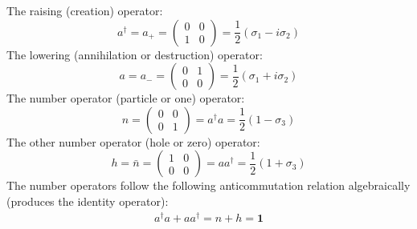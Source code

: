 The raising (creation) operator: 
\begin{equation}
    a^{\dagger} = a_{+} = \begin{pmatrix} 0 & 0 \\ 1 & 0 \end{pmatrix} = \frac{1}{2}(\sigma_{1} - i\sigma_{2})
\end{equation}
The lowering (annihilation or destruction) operator:
\begin{equation}
    a = a_{-} = \begin{pmatrix} 0 & 1 \\ 0 & 0 \end{pmatrix}  = \frac{1}{2}(\sigma_{1} + i\sigma_{2})
\end{equation}
The number operator (particle or one) operator:
\begin{equation}
    n = \begin{pmatrix}  0 & 0 \\ 0 & 1 \end{pmatrix} = a^{\dagger}a = \frac{1}{2}(1 - \sigma_{3})
\end{equation}
The other number operator (hole or zero) operator:
\begin{equation}
    h = \bar{n} = \begin{pmatrix} 1 & 0 \\ 0 & 0 \end{pmatrix} = aa^{\dagger} = \frac{1}{2} ( 1 + \sigma_{3})
\end{equation}
The number operators follow the following anticommutation relation algebraically (produces the identity operator): 
\begin{eqnarray}
a^{\dagger}a + aa^{\dagger} = n + h = \textbf{1}
\end{eqnarray}
